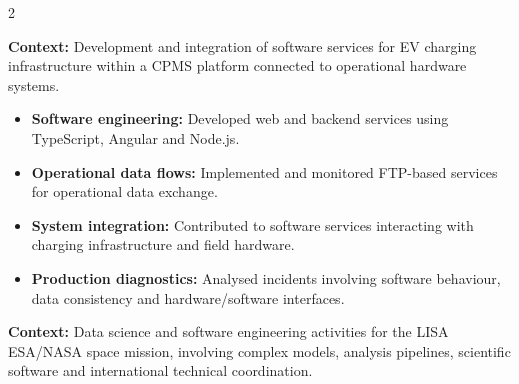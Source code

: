 \documentclass[8pt,a4paper,ragged2e,withhyper]{altacv}
\begin{document}



\makecvheader

\vspace{-0.3cm}


\begin{paracol}{2}



\textbf{Context:} Development and integration of software services for EV charging infrastructure within a CPMS platform connected to operational hardware systems.

\begin{itemize}
\item \textbf{Software engineering:} Developed web and backend services using TypeScript, Angular and Node.js.
\item \textbf{Operational data flows:} Implemented and monitored FTP-based services for operational data exchange.
\item \textbf{System integration:} Contributed to software services interacting with charging infrastructure and field hardware.
\item \textbf{Production diagnostics:} Analysed incidents involving software behaviour, data consistency and hardware/software interfaces.
\end{itemize}

\divider


\textbf{Context:} Data science and software engineering activities for the LISA ESA/NASA space mission, involving complex models, analysis pipelines, scientific software and international technical coordination.


\end{paracol}
\end{document}
